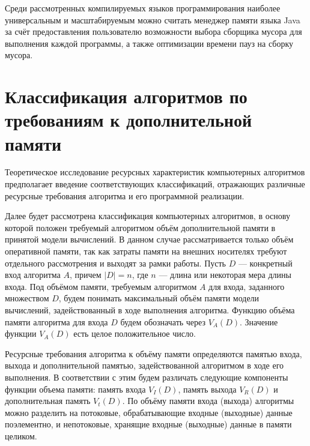Среди рассмотренных компилируемых языков программирования наиболее универсальным и масштабируемым можно считать менеджер памяти языка Java за счёт предоставления пользователю возможности выбора сборщика мусора для выполнения каждой программы, а также оптимизации времени пауз на сборку мусора.



\section*{Классификация алгоритмов по требованиям к дополнительной памяти}
\label{alg_classes}

Теоретическое исследование ресурсных характеристик компьютерных алгоритмов предполагает введение соответствующих классификаций, отражающих различные ресурсные требования алгоритма и его программной реализации.~\cite{uljanov}

Далее будет рассмотрена классификация компьютерных алгоритмов, в основу которой положен требуемый алгоритмом объём дополнительной памяти в принятой модели вычислений. В данном случае рассматривается только объём оперативной
памяти, так как затраты памяти на внешних носителях требуют отдельного рассмотрения и выходят за рамки работы. Пусть $D$ --- конкретный вход алгоритма $A$, причем $|D| = n$, где $n$ --- длина или некоторая мера длины входа. Под объёмом памяти, требуемым алгоритмом $A$ для входа, заданного множеством $D$, будем понимать максимальный объём памяти модели вычислений, задействованный в ходе выполнения алгоритма. Функцию объёма памяти алгоритма для входа $D$ будем обозначать через $V_A(D)$. Значение функции $V_A(D)$ есть целое положительное число.~\cite{uljanov}

Ресурсные требования алгоритма к объёму памяти определяются памятью входа, выхода и дополнительной памятью, задействованной алгоритмом в ходе его выполнения. В соответствии с этим будем различать следующие компоненты функции объема памяти: память входа $V_I(D)$, память выхода $V_R(D)$ и дополнительная память $V_t(D)$. По объёму памяти входа (выхода) алгоритмы можно разделить на потоковые, обрабатывающие входные (выходные) данные поэлементно, и непотоковые, хранящие входные (выходные) данные в памяти целиком.~\cite{uljanov}

